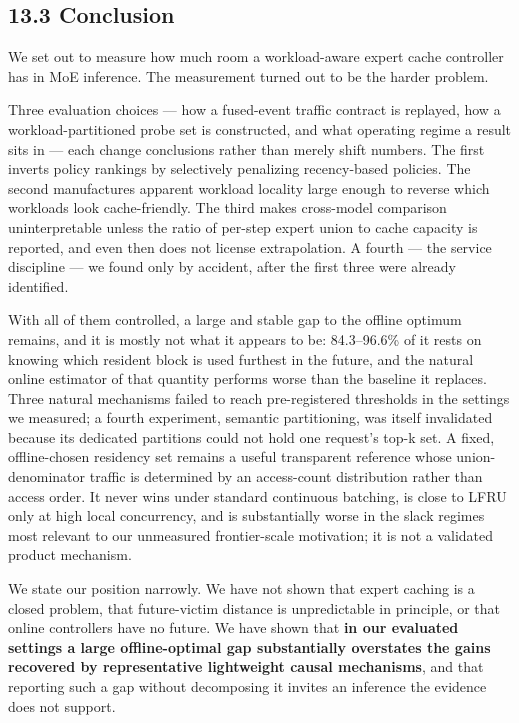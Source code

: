 \documentclass[
  10pt,
  letterpaper,
  10pt]{article}
\begin{document}
\subsection{13.3 Conclusion}\label{conclusion}

We set out to measure how much room a workload-aware expert cache
controller has in MoE inference. The measurement turned out to be the
harder problem.

Three evaluation choices --- how a fused-event traffic contract is
replayed, how a workload-partitioned probe set is constructed, and what
operating regime a result sits in --- each change conclusions rather
than merely shift numbers. The first inverts policy rankings by
selectively penalizing recency-based policies. The second manufactures
apparent workload locality large enough to reverse which workloads look
cache-friendly. The third makes cross-model comparison uninterpretable
unless the ratio of per-step expert union to cache capacity is reported,
and even then does not license extrapolation. A fourth --- the service
discipline --- we found only by accident, after the first three were
already identified.

With all of them controlled, a large and stable gap to the offline
optimum remains, and it is mostly not what it appears to be:
84.3--96.6\% of it rests on knowing which resident block is used
furthest in the future, and the natural online estimator of that
quantity performs worse than the baseline it replaces. Three natural
mechanisms failed to reach pre-registered thresholds in the settings we
measured; a fourth experiment, semantic partitioning, was itself
invalidated because its dedicated partitions could not hold one
request's top-k set. A fixed, offline-chosen residency set remains a
useful transparent reference whose union-denominator traffic is
determined by an access-count distribution rather than access order. It
never wins under standard continuous batching, is close to LFRU only at
high local concurrency, and is substantially worse in the slack regimes
most relevant to our unmeasured frontier-scale motivation; it is not a
validated product mechanism.

We state our position narrowly. We have not shown that expert caching is
a closed problem, that future-victim distance is unpredictable in
principle, or that online controllers have no future. We have shown that
\textbf{in our evaluated settings a large offline-optimal gap
substantially overstates the gains recovered by representative
lightweight causal mechanisms}, and that reporting such a gap without
decomposing it invites an inference the evidence does not support.
\end{document}
